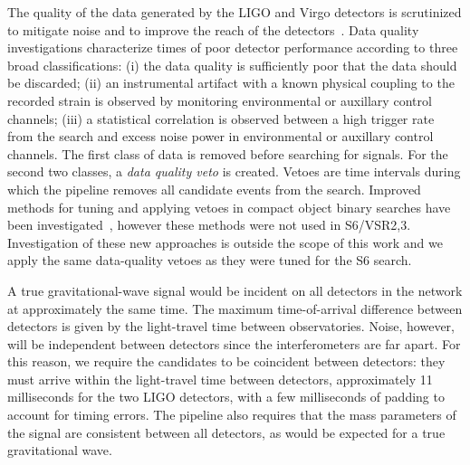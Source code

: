 The quality of the data generated by the LIGO and Virgo detectors is
scrutinized to mitigate noise and to improve the reach of the 
detectors~\cite{Aasi:2012wd,Aasi:2014mqd}. Data
quality investigations characterize times of poor detector performance
according to three broad classifications: (i) the data quality is sufficiently
poor that the data should be discarded; (ii) an instrumental artifact with a
known physical coupling to the recorded strain is observed by monitoring
environmental or auxillary control channels; (iii) a statistical correlation
is observed between a high trigger rate from the search and excess noise power
in environmental or auxillary control channels. The first class of data is
removed before searching for signals. For the second two classes, a \emph{data
quality veto} is created. Vetoes are time intervals during
which the pipeline removes all candidate events from the search.
Improved methods for tuning and applying vetoes in compact object binary
searches have been investigated~\cite{Canton:2013joa}, however these methods
were not used in S6/VSR2,3. Investigation of these new approaches is outside
the scope of this work and we apply the same data-quality vetoes as
they were tuned for the S6 search.

A true gravitational-wave signal would be incident on all detectors in the network at
approximately the same time. The maximum time-of-arrival difference between
detectors is given by the light-travel time between observatories. Noise,
however, will be independent between detectors since the interferometers
are far apart. For this reason, we require the candidates to be coincident
between detectors: they must arrive within the light-travel time between detectors,
approximately 11 milliseconds for the two LIGO detectors, with
a few milliseconds of padding to account for timing errors. The pipeline also
requires that the mass parameters of the signal are consistent between all
detectors, as would be expected for a true gravitational wave. 

